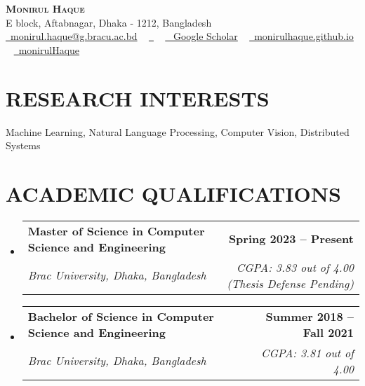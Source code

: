 \documentclass[letterpaper,10.5pt]{article}
\makeatletter
\newcommand{\resumeSubheading}[4]{
  \vspace{-2pt}\item
    \begin{tabular*}{1.0\textwidth}[t]{l@{\extracolsep{\fill}}r}
      \textbf{#1} & \textbf{\small #2} \\
      \textit{\small#3} & \textit{\small #4} \\
    \end{tabular*}\vspace{-7pt}
}
\newcommand{\resumeSubHeadingListStart}{\begin{itemize}[leftmargin=0.0in, label={}]}
\newcommand{\resumeSubHeadingListEnd}{\end{itemize}}
\makeatother
\begin{document}

\begin{center}
  {\textbf{\Huge \scshape Monirul Haque}}  \\ \vspace{0.08in}
  E block, Aftabnagar, Dhaka - 1212, Bangladesh \\ \vspace{1pt}
  \href{mailto:monirul.haque@g.Bracu.ac.bd}{\raisebox{-0.05\height}\faEnvelope\  \color{NavyBlue}monirul.haque@g.bracu.ac.bd} ~
  \href{https://www.linkedin.com/in/monirulhaq/}{\raisebox{-0.05\height} \faLinkedin\ \color{NavyBlue}{monirulhaq}}  ~
  \href{https://scholar.google.com/citations?user=PfjUg1UAAAAJ&hl=en&oi=sra}{\raisebox{-0.05\height}\faGraduationCap\  \color{NavyBlue} Google Scholar} ~
  \href{https://monirulhaque.github.io/}{\raisebox{-0.05\height}\faHome\ \color{NavyBlue}monirulhaque.github.io}  ~
  \href{https://github.com/monirulHaque}{\raisebox{-0.05\height}\faGithub\ \color{NavyBlue}monirulHaque}  ~


  \vspace{-6pt}
\end{center}

\section{RESEARCH INTERESTS}
Machine Learning, Natural Language Processing, Computer Vision, Distributed Systems

\vspace{-6pt}

\section{ACADEMIC QUALIFICATIONS}
\resumeSubHeadingListStart
\resumeSubheading
{Master of Science in Computer Science and Engineering}{Spring 2023 -- Present}
{Brac University, Dhaka, Bangladesh}{CGPA: 3.83 out of 4.00 (Thesis Defense Pending)}
\resumeSubheading
{Bachelor of Science in Computer Science and Engineering}{Summer 2018 -- Fall 2021}
{Brac University, Dhaka, Bangladesh}{CGPA: 3.81 out of 4.00}
\resumeSubHeadingListEnd
\end{document}
